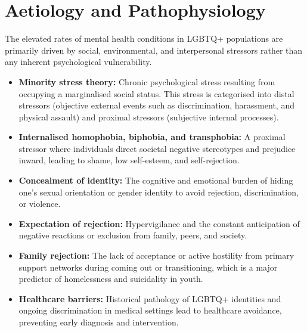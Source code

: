 \section*{Aetiology and Pathophysiology}
The elevated rates of mental health conditions in LGBTQ+ populations are primarily driven by social, environmental, and interpersonal stressors rather than any inherent psychological vulnerability.
\begin{itemize}
    \item \textbf{Minority stress theory:} Chronic psychological stress resulting from occupying a marginalised social status. This stress is categorised into distal stressors (objective external events such as discrimination, harassment, and physical assault) and proximal stressors (subjective internal processes).
    \item \textbf{Internalised homophobia, biphobia, and transphobia:} A proximal stressor where individuals direct societal negative stereotypes and prejudice inward, leading to shame, low self-esteem, and self-rejection.
    \item \textbf{Concealment of identity:} The cognitive and emotional burden of hiding one's sexual orientation or gender identity to avoid rejection, discrimination, or violence.
    \item \textbf{Expectation of rejection:} Hypervigilance and the constant anticipation of negative reactions or exclusion from family, peers, and society.
    \item \textbf{Family rejection:} The lack of acceptance or active hostility from primary support networks during coming out or transitioning, which is a major predictor of homelessness and suicidality in youth.
    \item \textbf{Healthcare barriers:} Historical pathology of LGBTQ+ identities and ongoing discrimination in medical settings lead to healthcare avoidance, preventing early diagnosis and intervention.
\end{itemize}

